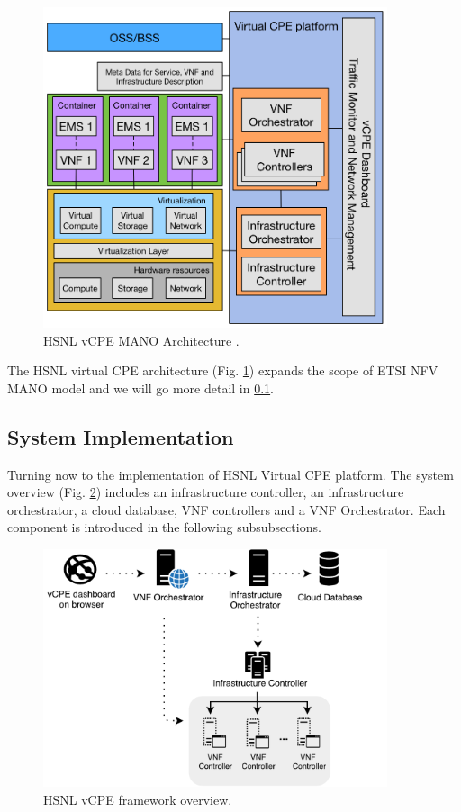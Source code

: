 \begin{figure}[!t]
\centering
\includegraphics[width=0.9\textwidth]{./fig/hsnl_vcpe_architecture}
\caption{HSNL vCPE MANO Architecture \cite{che-wei-master}.}
\label{fig:hsnl_vcpe_architecture}
\end{figure}

The HSNL virtual CPE architecture (Fig. \ref{fig:hsnl_vcpe_architecture}) expands the scope of ETSI NFV MANO model and we will go more detail in \ref{ssec:hsnl_system_imple}.


\subsection{System Implementation} \label{ssec:hsnl_system_imple}
Turning now to the implementation of HSNL Virtual CPE platform.  The system overview (Fig. \ref{fig:hsnl_vcpe_framework}) includes an infrastructure controller, an infrastructure orchestrator, a cloud database, VNF controllers and a VNF Orchestrator. Each component is introduced in the following subsubsections.

\begin{figure}[!t]
\centering
\includegraphics[width=0.9\textwidth]{./fig/hsnl_vcpe_framework}
\caption{HSNL vCPE framework overview.}
\label{fig:hsnl_vcpe_framework}
\end{figure}

